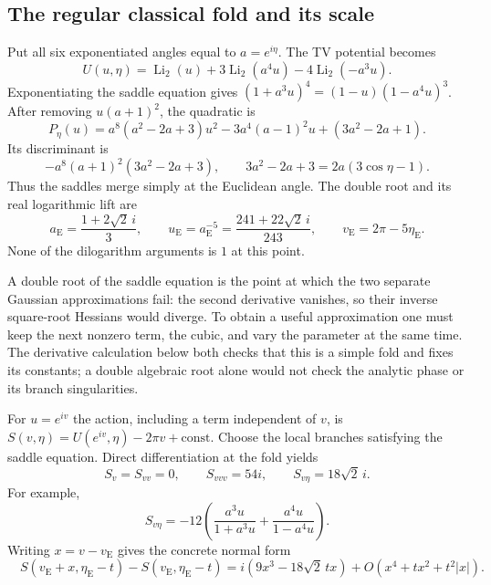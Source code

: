 \subsection{The regular classical fold and its scale}

Put all six exponentiated angles equal to $a=e^{i\eta}$.
The TV potential becomes
\[
 U(u,\eta)=\operatorname{Li}_2(u)
          +3\operatorname{Li}_2(a^4u)
          -4\operatorname{Li}_2(-a^3u).
\]
Exponentiating the saddle equation gives
$(1+a^3u)^4=(1-u)(1-a^4u)^3$. After removing
$u(a+1)^2$, the quadratic is
\begin{equation}
 P_\eta(u)=a^8(a^2-2a+3)u^2
              -3a^4(a-1)^2u+(3a^2-2a+1).
 \label{eq:regularsaddlequadratic}
\end{equation}
Its discriminant is
\[
 -a^8(a+1)^2(3a^2-2a+3),\qquad
 3a^2-2a+3=2a(3\cos\eta-1).
\]
Thus the saddles merge simply at the Euclidean angle.
The double root and its real logarithmic lift are
\[
 a_{\mathrm E}=\frac{1+2\sqrt2\,i}{3},\qquad
 u_{\mathrm E}=a_{\mathrm E}^{-5}
   =\frac{241+22\sqrt2\,i}{243},\qquad
 v_{\mathrm E}=2\pi-5\eta_{\mathrm E}.
\]
None of the dilogarithm arguments is $1$ at this point.

A double root of the saddle equation is the point at which the
two separate Gaussian approximations fail: the second derivative
vanishes, so their inverse square-root Hessians would diverge.
To obtain a useful approximation one must keep the next nonzero
term, the cubic, and vary the parameter at the same time. The
derivative calculation below both checks that this is a simple
fold and fixes its constants; a double algebraic root alone would
not check the analytic phase or its branch singularities.

For $u=e^{iv}$ the action, including a term independent of
$v$, is $S(v,\eta)=U(e^{iv},\eta)-2\pi v+\text{const.}$
Choose the local branches satisfying the saddle equation.
Direct differentiation at the fold yields
\[
 S_v=S_{vv}=0,\qquad
 S_{vvv}=54i,\qquad S_{v\eta}=18\sqrt2\,i.
\]
For example,
\[
 S_{v\eta}=-12\left(\frac{a^3u}{1+a^3u}
                         +\frac{a^4u}{1-a^4u}\right).
\]
Writing $x=v-v_{\mathrm E}$ gives the concrete normal form
\begin{equation}
 \boxed{\quad
 S(v_{\mathrm E}+x,\eta_{\mathrm E}-t)
       -S(v_{\mathrm E},\eta_{\mathrm E}-t)
 =i(9x^3-18\sqrt2\,t x)
       +O(x^4+t x^2+t^2|x|).
 \quad}
 \label{eq:regularcubicfold}
\end{equation}

